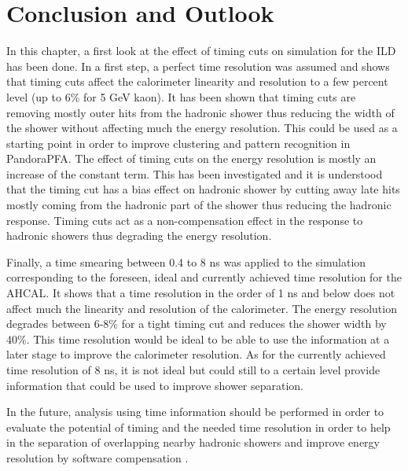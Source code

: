 \section{Conclusion and Outlook}

In this chapter, a first look at the effect of timing cuts on \geant simulation for the ILD has been done. In a first step, a perfect time resolution was assumed and shows that timing cuts affect the calorimeter linearity and resolution to a few percent level (up to 6\% for 5 GeV kaon). It has been shown that timing cuts are removing mostly outer hits from the hadronic shower thus reducing the width of the shower without affecting much the energy resolution. This could be used as a starting point in order to improve clustering and pattern recognition in PandoraPFA. The effect of timing cuts on the energy resolution is mostly an increase of the constant term. This has been investigated and it is understood that the timing cut has a bias effect on hadronic shower by cutting away late hits mostly coming from the hadronic part of the shower thus reducing the hadronic response. Timing cuts act as a non-compensation effect in the response to hadronic showers thus degrading the energy resolution.

Finally, a time smearing between 0.4 to 8 ns was applied to the simulation corresponding to the foreseen, ideal and currently achieved time resolution for the AHCAL. It shows that a time resolution in the order of 1 ns and below does not affect much the linearity and resolution of the calorimeter. The energy resolution degrades between 6-8\% for a tight timing cut and reduces the shower width by 40\%. This time resolution would be ideal to be able to use the information at a later stage to improve the calorimeter resolution. As for the currently achieved time resolution of 8 ns, it is not ideal but could still to a certain level provide information that could be used to improve shower separation.

In the future, analysis using time information should be performed in order to evaluate the potential of timing and the needed time resolution in order to help in the separation of overlapping nearby hadronic showers and improve energy resolution by software compensation \cite{Benaglia2016}.

